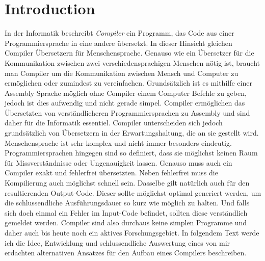 \chapter{Introduction}
In der Informatik beschreibt \textit{Compiler} ein Programm, das Code aus einer Programmiersprache in eine andere übersetzt. In dieser Hinsicht gleichen Compiler Übersetzern für Menschensprache.
Genauso wie ein Übersetzer für die Kommunikation zwischen zwei verschiedensprachigen Menschen nötig ist, braucht man Compiler um die Kommunikation zwischen Mensch und Computer zu ermöglichen oder zumindest zu vereinfachen.
Grundsätzlich ist es mithilfe einer Assembly Sprache möglich ohne Compiler einem Computer Befehle zu geben, jedoch ist dies aufwendig und nicht gerade simpel. 
Compiler ermöglichen das Übersetzten von verständlicheren Programmiersprachen zu Assembly und sind daher für die Informatik essentiel.
Compiler unterscheiden sich jedoch grundsätzlich von Übersetzern in der Erwartungshaltung, die an sie gestellt wird. Menschensprache ist sehr komplex und nicht immer besonders eindeutig. 
Programmiersprachen hingegen sind so definiert, dass sie möglichst keinen Raum für Missverständnisse oder Ungenauigkeit lassen. Genauso muss auch ein Compiler exakt und fehlerfrei übersetzten.
Neben fehlerfrei muss die Kompilierung auch möglichst schnell sein. Dasselbe gilt natürlich auch für den resultierenden Output-Code. Dieser sollte möglichst optimal generiert werden, um die schlussendliche
Ausführungsdauer so kurz wie möglich zu halten. Und falls sich doch einmal ein Fehler im Input-Code befindet, sollten diese verständlich gemeldet werden. Compiler sind also durchaus keine simplen Programme und daher auch bis heute noch
ein aktives Forschungsgebiet. In folgendem Text werde ich die Idee, Entwicklung und schlussendliche Auswertung eines von mir erdachten alternativen Ansatzes für den Aufbau eines Compilers beschreiben. 
